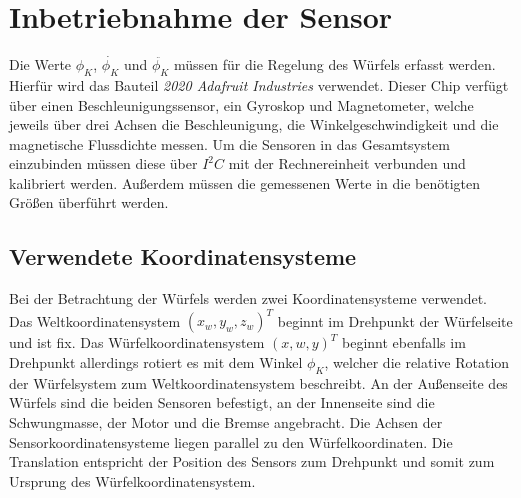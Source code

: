 \documentclass{article}
\begin{document}
\renewcommand{\rmdefault}{phv}
\renewcommand{\sfdefault}{phv}
\renewcommand{\arraystretch}{1.1}

\section{Inbetriebnahme der Sensor}
Die Werte $\phi_K$, $\dot{\phi_K}$ und $\ddot{\phi_K}$ müssen für die Regelung des Würfels erfasst werden. Hierfür wird das Bauteil \textit{2020 Adafruit Industries} verwendet. Dieser Chip verfügt über einen Beschleunigungssensor, ein Gyroskop und Magnetometer, welche jeweils über drei Achsen die Beschleunigung, die Winkelgeschwindigkeit und die magnetische Flussdichte messen. 
Um die Sensoren in das Gesamtsystem einzubinden müssen diese über $I^2C$ mit der Rechnereinheit verbunden und kalibriert werden. Außerdem müssen die gemessenen Werte in die benötigten Größen überführt werden.

\subsection{Verwendete Koordinatensysteme}
Bei der Betrachtung der Würfels werden zwei Koordinatensysteme verwendet. Das Weltkoordinatensystem $(x_w, y_w, z_w)^T$ beginnt im Drehpunkt der Würfelseite und ist fix. Das Würfelkoordinatensystem $(x, w, y)^T$ beginnt ebenfalls im Drehpunkt allerdings rotiert es mit dem Winkel $\phi_K$, welcher die relative Rotation der Würfelsystem zum Weltkoordinatensystem beschreibt. An der Außenseite des Würfels sind die beiden Sensoren befestigt, an der Innenseite sind die Schwungmasse, der Motor und die Bremse angebracht. Die Achsen der Sensorkoordinatensysteme liegen parallel zu den Würfelkoordinaten. Die Translation entspricht der Position des Sensors zum Drehpunkt und somit zum Ursprung des Würfelkoordinatensystem.
\end{document}
